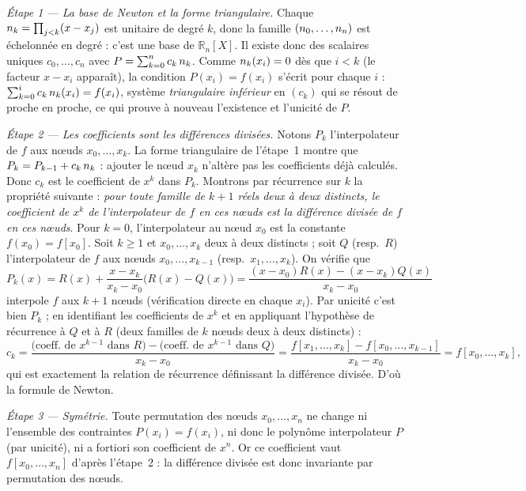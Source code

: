\vspace{10pt}

\begin{mdframed}[style=proofbar]
  \textit{Étape 1 — La base de Newton et la forme triangulaire.}
  Chaque $n_{k}=\prod_{j<k}(x-x_j)$ est unitaire de degré $k$, donc la
  famille $(n_{0},\ldots,n_{n})$ est échelonnée en degré : c'est
  une base de $\mathbb{R}_n[X]$. Il existe donc des scalaires uniques
  $c_0,\ldots,c_n$ avec $P=\sum_{k=0}^n c_k\,n_{k}$. Comme
  $n_{k}(x_i)=0$ dès que $i<k$ (le facteur $x-x_i$ apparaît), la
  condition $P(x_i)=f(x_i)$ s'écrit pour chaque $i$ :
  $\sum_{k=0}^{i} c_k\,n_{k}(x_i)=f(x_i)$, système \emph{triangulaire
  inférieur} en $(c_k)$ qui se résout de proche en proche, ce qui prouve à
  nouveau l'existence et l'unicité de $P$.

  \medskip
  \textit{Étape 2 — Les coefficients sont les différences divisées.}
  Notons $P_{k}$ l'interpolateur de $f$ aux nœuds $x_0,\ldots,x_k$. La
  forme triangulaire de l'étape~1 montre que $P_k=P_{k-1}+c_k\,n_{k}$ :
  ajouter le nœud $x_k$ n'altère pas les coefficients déjà calculés. Donc
  $c_k$ est le coefficient de $x^k$ dans $P_k$. Montrons par récurrence
  sur $k$ la propriété suivante : \emph{pour toute famille de $k+1$ réels
  deux à deux distincts, le coefficient de $x^k$ de l'interpolateur de $f$
  en ces nœuds est la différence divisée de $f$ en ces nœuds}. Pour $k=0$,
  l'interpolateur au nœud $x_0$ est la constante $f(x_0)=f[x_0]$. Soit
  $k\geq 1$ et $x_0,\ldots,x_k$ deux à deux distincts ; soit $Q$
  (resp.\ $R$) l'interpolateur de $f$ aux nœuds $x_0,\ldots,x_{k-1}$
  (resp.\ $x_1,\ldots,x_k$). On vérifie que
  \[
    P_k(x) = R(x) + \frac{x-x_k}{x_k-x_0}\bigl(R(x)-Q(x)\bigr)
           = \frac{(x-x_0)R(x)-(x-x_k)Q(x)}{x_k-x_0}
  \]
  interpole $f$ aux $k+1$ nœuds (vérification directe en chaque $x_i$).
  Par unicité c'est bien $P_k$ ; en identifiant les coefficients de $x^k$
  et en appliquant l'hypothèse de récurrence à $Q$ et à $R$ (deux familles
  de $k$ nœuds deux à deux distincts) :
  \[
    c_k = \frac{\bigl(\text{coeff.\ de }x^{k-1}\text{ dans }R\bigr)
                -\bigl(\text{coeff.\ de }x^{k-1}\text{ dans }Q\bigr)}{x_k-x_0}
        = \frac{f[x_1,\ldots,x_k]-f[x_0,\ldots,x_{k-1}]}{x_k-x_0}
        = f[x_0,\ldots,x_k],
  \]
  qui est exactement la relation de récurrence définissant la différence
  divisée. D'où la formule de Newton.

  \medskip
  \textit{Étape 3 — Symétrie.}
  Toute permutation des nœuds $x_0,\ldots,x_n$ ne change ni l'ensemble des
  contraintes $P(x_i)=f(x_i)$, ni donc le polynôme interpolateur $P$ (par
  unicité), ni a fortiori son coefficient de $x^n$. Or ce coefficient
  vaut $f[x_0,\ldots,x_n]$ d'après l'étape~2 : la différence
  divisée est donc invariante par permutation des nœuds.


\end{mdframed}
